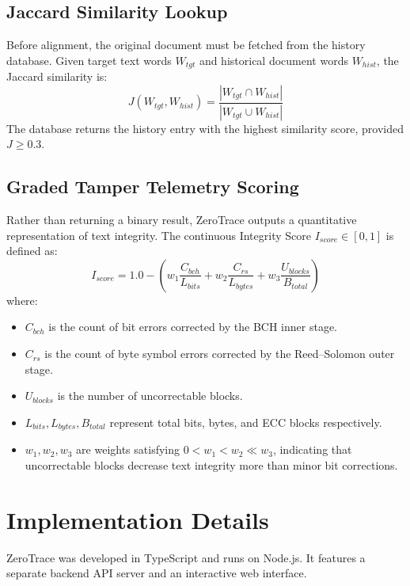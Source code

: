 \documentclass[conference]{IEEEtran}
\begin{document}
\subsection{Jaccard Similarity Lookup}
Before alignment, the original document must be fetched from the history database. Given target text words $W_{tgt}$ and historical document words $W_{hist}$, the Jaccard similarity is:
\begin{equation}
J(W_{tgt}, W_{hist}) = \frac{|W_{tgt} \cap W_{hist}|}{|W_{tgt} \cup W_{hist}|}
\end{equation}
The database returns the history entry with the highest similarity score, provided $J \geq 0.3$.

\subsection{Graded Tamper Telemetry Scoring}
Rather than returning a binary result, ZeroTrace outputs a quantitative representation of text integrity. The continuous Integrity Score $I_{score} \in [0, 1]$ is defined as:
\begin{equation}
I_{score} = 1.0 - \left( w_1 \frac{C_{bch}}{L_{bits}} + w_2 \frac{C_{rs}}{L_{bytes}} + w_3 \frac{U_{blocks}}{B_{total}} \right)
\end{equation}
where:
\begin{itemize}
    \item $C_{bch}$ is the count of bit errors corrected by the BCH inner stage.
    \item $C_{rs}$ is the count of byte symbol errors corrected by the Reed--Solomon outer stage.
    \item $U_{blocks}$ is the number of uncorrectable blocks.
    \item $L_{bits}, L_{bytes}, B_{total}$ represent total bits, bytes, and ECC blocks respectively.
    \item $w_1, w_2, w_3$ are weights satisfying $0 < w_1 < w_2 \ll w_3$, indicating that uncorrectable blocks decrease text integrity more than minor bit corrections.
\end{itemize}

\section{Implementation Details}
ZeroTrace was developed in TypeScript and runs on Node.js. It features a separate backend API server and an interactive web interface.
\end{document}
